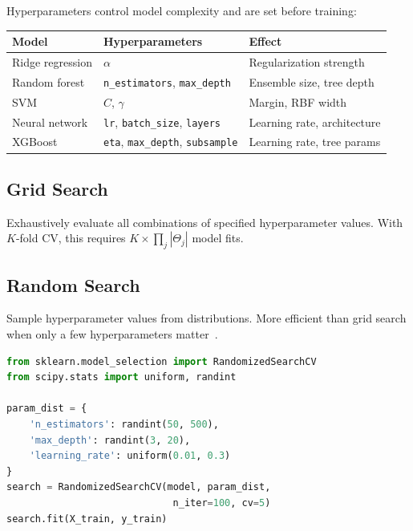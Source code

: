 Hyperparameters control model complexity and are set before training:

\begin{longtable}{p{3.5cm}p{4cm}p{4cm}}
	\toprule
	\textbf{Model}   & \textbf{Hyperparameters}                              & \textbf{Effect}             \\
	\midrule
	Ridge regression & $\alpha$                                              & Regularization strength     \\
	Random forest    & \texttt{n\_estimators}, \texttt{max\_depth}           & Ensemble size, tree depth   \\
	SVM              & $C$, $\gamma$                                         & Margin, RBF width           \\
	Neural network   & \texttt{lr}, \texttt{batch\_size}, \texttt{layers}    & Learning rate, architecture \\
	XGBoost          & \texttt{eta}, \texttt{max\_depth}, \texttt{subsample} & Learning rate, tree params  \\
	\bottomrule
\end{longtable}

\subsection{Grid Search}

Exhaustively evaluate all combinations of specified hyperparameter values. With $K$-fold CV, this requires $K \times \prod_j |\Theta_j|$ model fits.

\subsection{Random Search}

Sample hyperparameter values from distributions. More efficient than grid search when only a few hyperparameters matter~\cite{bergstra2012random}.

\begin{lstlisting}[language=Python, caption=Random search with CV]
from sklearn.model_selection import RandomizedSearchCV
from scipy.stats import uniform, randint

param_dist = {
    'n_estimators': randint(50, 500),
    'max_depth': randint(3, 20),
    'learning_rate': uniform(0.01, 0.3)
}
search = RandomizedSearchCV(model, param_dist,
                             n_iter=100, cv=5)
search.fit(X_train, y_train)
\end{lstlisting}

